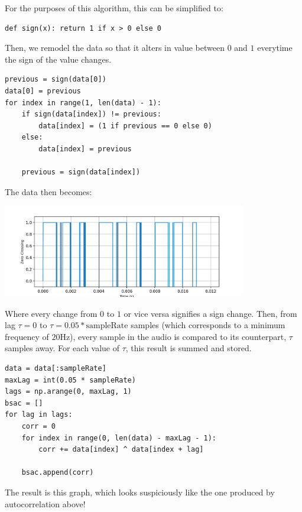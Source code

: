\documentclass{article}
\begin{document}
For the purposes of this algorithm, this can be simplified to:

\begin{verbatim}
def sign(x): return 1 if x > 0 else 0
\end{verbatim}

Then, we remodel the data so that it alters in value between $0$ and $1$ everytime the sign of the value changes.

\begin{verbatim}
previous = sign(data[0])
data[0] = previous
for index in range(1, len(data) - 1):
    if sign(data[index]) != previous:
        data[index] = (1 if previous == 0 else 0)
    else:
        data[index] = previous

    previous = sign(data[index])
\end{verbatim}

The data then becomes:

\begin{center} \includegraphics[width=0.8\textwidth]{img/bsac_zc.png} \end{center}

Where every change from $0$ to $1$ or vice versa signifies a sign change. Then, from lag $\tau = 0$ to $\tau = 0.05 * \text{sampleRate}$ samples (which corresponds to a minimum frequency of $20$Hz), every sample in the audio is compared to its counterpart, $\tau$ samples away. For each value of $\tau$, this result is summed and stored.

\begin{verbatim}
data = data[:sampleRate]
maxLag = int(0.05 * sampleRate)
lags = np.arange(0, maxLag, 1)
bsac = []
for lag in lags:
    corr = 0
    for index in range(0, len(data) - maxLag - 1):
        corr += data[index] ^ data[index + lag]
    
    bsac.append(corr)
\end{verbatim}

The result is this graph, which looks suspiciously like the one produced by autocorrelation above!
\end{document}
